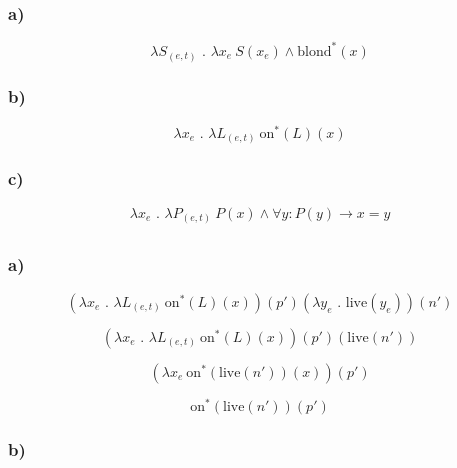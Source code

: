 \documentclass{article}
\renewcommand\t[1]{\text{#1}}
\renewcommand\d{\text{ . }}
\begin{document}

\section{}

\subsection{}

\subsubsection*{a)}

$$
\lambda S_{(e,t)} \d \lambda x_e \ S(x_e) \wedge \t{blond}^*(x) 
$$

\subsubsection*{b)}

$$
\lambda x_e \d \lambda L_{(e,t)} \ \t{on}^*(L)(x)
$$

\subsubsection*{c)}

$$
\lambda x_e \d \lambda P_{(e,t)} \ P(x) \wedge \forall y: P(y) \rightarrow x = y
$$

\subsection{}

\subsubsection*{a)}

$$
(\lambda x_e \d \lambda L_{(e,t)} \ \t{on}^*(L)(x))(p')(\lambda y_e \d \t{live}(y_e))(n')
$$

$$
(\lambda x_e \d \lambda L_{(e,t)} \ \t{on}^*(L)(x))(p')(\t{live}(n'))
$$

$$
(\lambda x_e \ \t{on}^*(\t{live}(n'))(x))(p')
$$

$$
\t{on}^*(\t{live}(n'))(p')
$$

\subsubsection*{b)}
\end{document}
